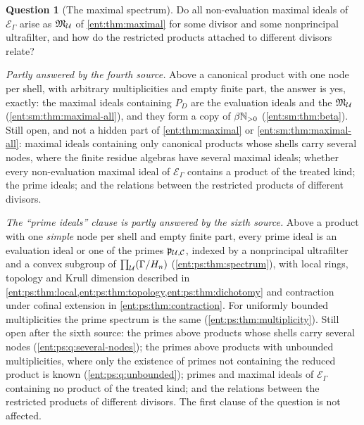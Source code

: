 \documentclass[11pt]{article}
\theoremstyle{plain}
\theoremstyle{plain}
\theoremstyle{plain}
\theoremstyle{definition}
\theoremstyle{definition}
\theoremstyle{definition}
\theoremstyle{definition}
\newtheorem{question}[question]{Question}
\theoremstyle{remark}
\newcommand{\E}{\mathcal E_\Gamma}
\begin{document}
\begin{question}[The maximal spectrum]\label{ent:q:spectrum}
Do all non-evaluation maximal ideals of $\E$ arise as $\mathfrak M_\mathcal U$ of
\cref{ent:thm:maximal} for some divisor and some nonprincipal ultrafilter,
and how do the restricted products attached to different divisors relate?
\end{question}
\emph{Partly answered by the fourth source.} Above a canonical product with
one node per shell, with arbitrary multiplicities and empty finite part, the
answer is yes, exactly: the maximal ideals containing $P_D$ are the
evaluation ideals and the $\mathfrak M_\mathcal U$
(\cref{ent:sm:thm:maximal-all}), and they form a copy of $\beta\mathbb N_{>0}$
(\cref{ent:sm:thm:beta}). Still open, and not a hidden part of
\cref{ent:thm:maximal} or \cref{ent:sm:thm:maximal-all}: maximal ideals
containing only canonical products whose shells carry several nodes, where the
finite residue algebras have several maximal ideals; whether every
non-evaluation maximal ideal of $\E$ contains a product of the treated kind;
the prime ideals; and the relations between the restricted products of
different divisors.

\emph{The ``prime ideals'' clause is partly answered by the sixth source.}
Above a product with one \emph{simple} node per shell and empty finite part,
every prime ideal is an evaluation ideal or one of the primes
$\mathfrak p_{\mathcal U,\mathcal C}$, indexed by a nonprincipal ultrafilter and a
convex subgroup of $\prod_\mathcal U(\Gamma/H_n)$
(\cref{ent:ps:thm:spectrum}), with local rings, topology and Krull dimension
described in \cref{ent:ps:thm:local,ent:ps:thm:topology,ent:ps:thm:dichotomy}
and contraction under cofinal extension in \cref{ent:ps:thm:contraction}.
For uniformly bounded multiplicities the prime spectrum is the same
(\cref{ent:ps:thm:multiplicity}). Still open after the sixth source: the
primes above products whose shells carry several nodes
(\cref{ent:ps:q:several-nodes}); the primes above products with unbounded
multiplicities, where only the existence of primes not containing the reduced
product is known (\cref{ent:ps:q:unbounded}); primes and maximal ideals of
$\E$ containing no product of the treated kind; and the relations between the
restricted products of different divisors. The first clause of the question
is not affected.
\end{document}
